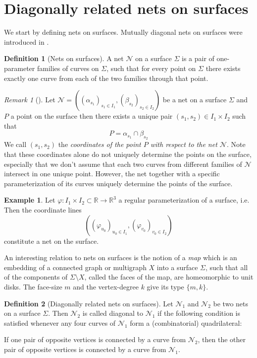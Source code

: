 \documentclass[12pt,a4paper]{article}
\theoremstyle{definition}
\newtheorem{definition}{Definition}[section]
\theoremstyle{remark}
\newtheorem{remark}{\textit{Remark}}[section]
\theoremstyle{definition}
\newtheorem{example}{Example}[section]
\begin{document}
\section{Diagonally related nets on surfaces}
We start by defining nets on surfaces. Mutually diagonal nets on surfaces were introduced in \cite{MutuallyDiagonalNets2019}.

\begin{definition}[Nets on surfaces]
\label{def:nets-on-surfaces}
A net $\mathcal{N}$ on a surface $\Sigma$ is a pair of one-parameter families of curves on $\Sigma$, such that for every point on $\Sigma$ there exists exactly one curve from each of the two families through that point.
\end{definition}

\begin{remark}[]
\label{rm:label}
Let $\mathcal{N} = \left( (\alpha_{s_{1}})_{s_{1} \in I_1}, (\beta_{s_{2}})_{s_{2} \in I_2} \right)$ be a net on a surface
$\Sigma$ and $P$ a point on the surface then there exists a unique pair $(s_{1}, s_{2}) \in I_{1}\times I_{2}$ such that
\[
    P = \alpha_{s_1} \cap \beta_{s_2}
\]
We call $(s_1, s_2)$ the \textit{coordinates of the point $P$ with respect to the net $\mathcal{N}$}. Note that these coordinates alone do not uniquely determine the points on the surface, especially that we don't assume that each two curves from different families of $\mathcal{N}$ intersect in one unique point. However, the net together with a specific parameterization of its curves uniquely determine the points of the surface.
\end{remark}

\begin{example}
\label{ex:nets-on-surfaces}
Let $\varphi : I_{1} \times I_{2} \subset \mathbb{R} \to \mathbb{R}^3$ a regular parameterization of a surface, i.e.
Then the coordinate lines
\[
    \left( (\varphi_{u_0})_{u_{0} \in I_1}, (\varphi_{v_0})_{v_{0} \in I_2}  \right)
\]
constitute a net on the surface.

\end{example}
An interesting relation to nets on surfaces is the notion of a \textit{map} \cite{} which is an embedding of a connected
graph or multigraph $X$ into a surface $\Sigma$, such that all of the components of $\Sigma \setminus X$, called
the faces of the map, are homeomorphic to unit disks. The face-size $m$ and the vertex-degree $k$ give its type $\{m, k\}$.

\begin{definition}[Diagonally related nets on surfaces]
\label{def:diag-nets-on-surfaces}
Let $\mathcal{N}_{1}$ and $\mathcal{N}_{2}$ be two nets on a surface $\Sigma$. Then $\mathcal{N}_{2}$ is called diagonal
to $\mathcal{N}_{1}$ if the following condition is satisfied whenever any four curves of $\mathcal{N}_{1}$ form a
(combinatorial) quadrilateral:\\
\begin{mybox}{}
If one pair of opposite vertices is connected by a curve from $\mathcal{N}_{2}$, then the other pair of opposite vertices is connected by a curve from $\mathcal{N}_{1}$.
\end{mybox}
\end{definition}
\end{document}
